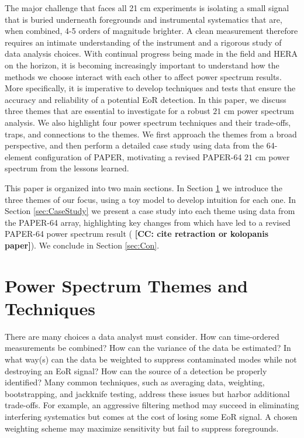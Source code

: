 \documentclass[preprint2,numberedappendix,tighten]{aastex6}  %
\newcommand{\cc}[1]{{\color{purple} \textbf{[CC: #1]}}}
\begin{document}
The major challenge that faces all 21 cm experiments is isolating a small signal that is buried underneath foregrounds and instrumental systematics that are, when combined, 4-5 orders of magnitude brighter. A clean measurement therefore requires an intimate understanding of the instrument and a rigorous study of data analysis choices. With continual progress being made in the field and HERA on the horizon, it is becoming increasingly important to understand how the methods we choose interact with each other to affect power spectrum results. More specifically, it is imperative to develop techniques and tests that ensure the accuracy and reliability of a potential EoR detection. In this paper, we discuss three themes that are essential to investigate for a robust $21$ cm power spectrum analysis. We also highlight four power spectrum techniques and their trade-offs, traps, and connections to the themes. We first approach the themes from a broad perspective, and then perform a detailed case study using data from the 64-element configuration of PAPER, motivating a revised PAPER-64 $21$ cm power spectrum from the lessons learned.

This paper is organized into two main sections. In Section \ref{sec:Themes} we introduce the three themes of our focus, using a toy model to develop intuition for each one. In Section \ref{sec:CaseStudy} we present a case study into each theme using data from the PAPER-64 array, highlighting key changes from \citet{ali_et_al2015} which have led to a revised PAPER-64 power spectrum result (\cc{cite retraction or kolopanis paper}). We conclude in Section \ref{sec:Con}.


\section{Power Spectrum Themes and Techniques}
\label{sec:Themes}

There are many choices a data analyst must consider. How can time-ordered measurements be combined? How can the variance of the data be estimated? In what way(s) can the data be weighted to suppress contaminated modes while not destroying an EoR signal? How can the source of a detection be properly identified? Many common techniques, such as averaging data, weighting, bootstrapping, and jackknife testing, address these issues but harbor additional trade-offs. For example, an aggressive filtering method may succeed in eliminating interfering systematics but comes at the cost of losing some EoR signal. A chosen weighting scheme may maximize sensitivity but fail to suppress foregrounds. 
\end{document}
